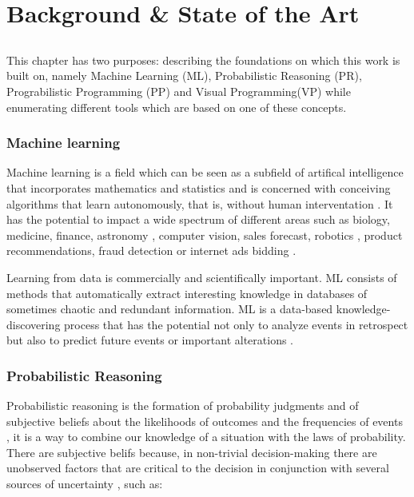 \chapter{Background & State of the Art} \label{chap:sota}

\section*{}

This chapter has two purposes: describing the foundations on which this work
is built on, namely Machine Learning (ML), Probabilistic Reasoning (PR),
Prograbilistic Programming (PP) and
Visual Programming(VP) while enumerating different tools which are based
on one of these concepts.

\subsection{Machine learning}

Machine learning is a field which can be seen as a subfield of artifical
intelligence that incorporates mathematics and statistics and is concerned
with conceiving algorithms that learn autonomously, that is, without human
interventation \cite{mlbrit}\cite{mlnot}.
It has the potential to impact a wide spectrum of
different areas such as biology, medicine, finance, astronomy
\cite{Amatriain:2013:BDU:2541176.2514691}, computer vision, sales forecast,
robotics \cite{intml}, product recommendations, fraud detection or
internet ads bidding \cite{SciPy}.

Learning from data is commercially and scientifically important. ML consists of
methods that automatically extract interesting knowledge in databases of sometimes chaotic and
redundant information. ML is a data-based knowledge-discovering process that
has the potential not only to analyze events in retrospect but also to predict
future events or important alterations \cite{mapt}.

\subsection{Probabilistic Reasoning}

Probabilistic reasoning is the formation of probability judgments and of
subjective beliefs about the likelihoods of outcomes and the frequencies of
events \cite{probr}, it is a way to combine our knowledge of a situation
with the laws of probability. There are subjective belifs because, in non-trivial
decision-making there are unobserved factors that are critical to the decision
in conjunction with several sources of uncertainty \cite{reas}, such as:

